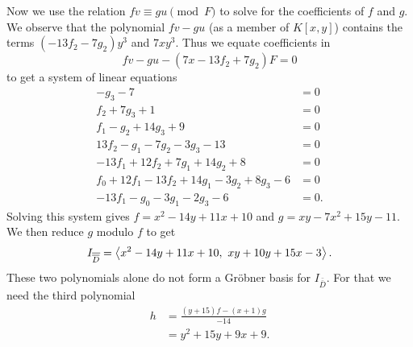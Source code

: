 Now we use the relation $fv \equiv gu \pmod F$ to solve for the coefficients of $f$ and $g$.
We observe that the polynomial $fv - gu$ (as a member of $K[x,y]$) contains the terms
$(-13f_2 - 7g_2)y^3$ and $7xy^3$.
Thus we equate coefficients in 
\[ fv - gu - (7x - 13f_2 + 7g_2)F = 0 \]
to get a system of linear equations
\begin{align*}
  -g_3 - 7 &= 0 \\
  f_2 + 7g_3 + 1 &= 0 \\
  f_1 - g_2 + 14g_3 + 9 &= 0 \\
  13f_2 - g_1 - 7g_2 - 3g_3 - 13 &= 0 \\
  -13f_1 + 12f_2 + 7g_1 + 14g_2 + 8 &= 0 \\
  f_0 + 12f_1 - 13f_2 + 14g_1 - 3g_2 + 8g_3 - 6 &= 0 \\
  -13f_1 - g_0 - 3g_1 - 2g_3 - 6 &= 0.
\end{align*}
Solving this system gives $f = x^2 - 14y + 11x + 10$ and $g = xy - 7x^2 + 15y - 11$.
We then reduce $g$ modulo $f$ to get
\[ I_{\overline{\overline D}} = \left\langle x^2 - 14y + 11x + 10, ~xy + 10y + 15x - 3 \right\rangle. \]
These two polynomials alone do not form a Gr\"obner basis for $I_{\bar{\bar D}}$.
For that we need the third polynomial
\begin{align*}
  h &= \frac {(y + 15)f - (x + 1)g} {-14} \\
    &= y^2 + 15y + 9x + 9.
\end{align*}
